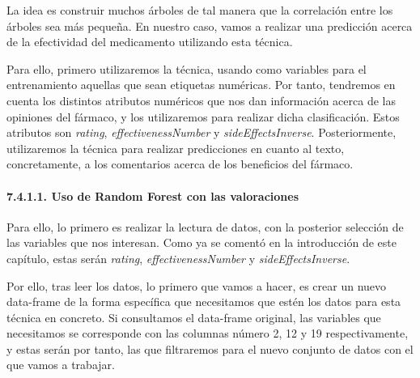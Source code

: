 \documentclass[spanish,]{article}
\let\oldparagraph\paragraph
\renewcommand{\paragraph}[1]{\oldparagraph{#1}\mbox{}}
\begin{document}
La idea es construir muchos árboles de tal manera que la correlación
entre los árboles sea más pequeña. En nuestro caso, vamos a realizar una
predicción acerca de la efectividad del medicamento utilizando esta
técnica.

Para ello, primero utilizaremos la técnica, usando como variables para
el entrenamiento aquellas que sean etiquetas numéricas. Por tanto,
tendremos en cuenta los distintos atributos numéricos que nos dan
información acerca de las opiniones del fármaco, y los utilizaremos para
realizar dicha clasificación. Estos atributos son \emph{rating},
\emph{effectivenessNumber} y \emph{sideEffectsInverse}. Posteriormente,
utilizaremos la técnica para realizar predicciones en cuanto al texto,
concretamente, a los comentarios acerca de los beneficios del fármaco.

\paragraph{7.4.1.1. Uso de Random Forest con las
valoraciones}\label{uso-de-random-forest-con-las-valoraciones}

Para ello, lo primero es realizar la lectura de datos, con la posterior
selección de las variables que nos interesan. Como ya se comentó en la
introducción de este capítulo, estas serán \emph{rating},
\emph{effectivenessNumber} y \emph{sideEffectsInverse}.

Por ello, tras leer los datos, lo primero que vamos a hacer, es crear un
nuevo data-frame de la forma específica que necesitamos que estén los
datos para esta técnica en concreto. Si consultamos el data-frame
original, las variables que necesitamos se corresponde con las columnas
número 2, 12 y 19 respectivamente, y estas serán por tanto, las que
filtraremos para el nuevo conjunto de datos con el que vamos a trabajar.
\end{document}

